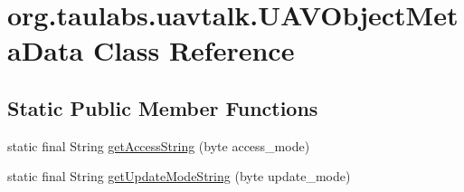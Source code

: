 \hypertarget{classorg_1_1taulabs_1_1uavtalk_1_1_u_a_v_object_meta_data}{\section{org.\-taulabs.\-uavtalk.\-U\-A\-V\-Object\-Meta\-Data Class Reference}
\label{classorg_1_1taulabs_1_1uavtalk_1_1_u_a_v_object_meta_data}
}
\subsection*{Static Public Member Functions}
\begin{DoxyCompactItemize}
\item 
static final String \hyperlink{classorg_1_1taulabs_1_1uavtalk_1_1_u_a_v_object_meta_data_a47f45bc1a914bbd723945b42072b0dd7}{get\-Access\-String} (byte access\-\_\-mode)
\item 
static final String \hyperlink{classorg_1_1taulabs_1_1uavtalk_1_1_u_a_v_object_meta_data_ae9dd149aba48b4eeccb01f184879074d}{get\-Update\-Mode\-String} (byte update\-\_\-mode)
\end{DoxyCompactItemize}
